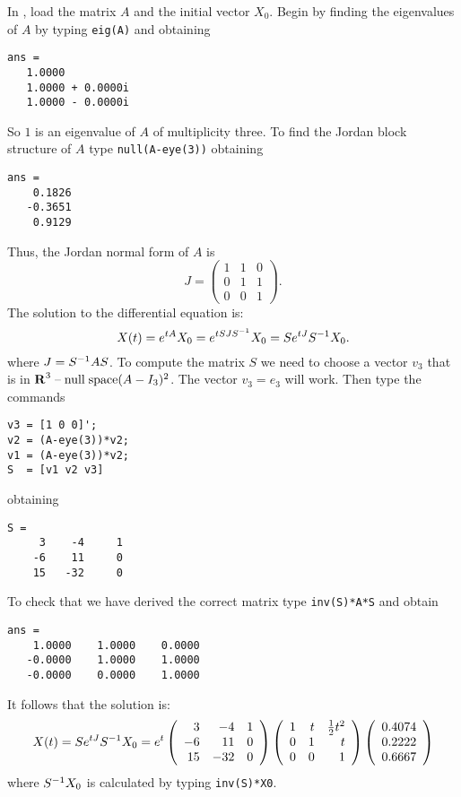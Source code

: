 \soln  In \Matlabp, load the matrix $A$ and the initial vector $X_0$. 
Begin by finding the eigenvalues of $A$ by typing {\tt eig(A)} and
obtaining
\begin{verbatim}
ans =
   1.0000          
   1.0000 + 0.0000i
   1.0000 - 0.0000i
\end{verbatim}
So $1$ is an eigenvalue of $A$ of multiplicity three.  To find the Jordan
block structure of $A$ type {\tt null(A-eye(3))} obtaining
\begin{verbatim}
ans =
    0.1826
   -0.3651
    0.9129
\end{verbatim}
Thus, the Jordan normal form of $A$ is 
\[
J = \left(\begin{array}{rrr} 1 & 1 & 0\\ 0 & 1 & 1\\ 0 & 0 & 1 
\end{array}\right).
\]
The solution to the differential equation is:
\[
X(t) = e^{tA}X_0 = e^{tSJS^{-1}}X_0= Se^{tJ}S^{-1} X_0.
\]
where $J=S^{-1} AS$.  To compute the matrix $S$ we need to choose a vector 
$v_3$ that is in $\mbox{$\bf{R}$}^3\;\mbox{--}\;{\rm null\;space}(A-I_3)^2$.  The vector $v_3=e_3$ will
work. Then type the commands
\begin{verbatim}
v3 = [1 0 0]';
v2 = (A-eye(3))*v2;
v1 = (A-eye(3))*v2;
S  = [v1 v2 v3]
\end{verbatim}
obtaining
\begin{verbatim}
S =
     3    -4     1
    -6    11     0
    15   -32     0
\end{verbatim}
To check that we have derived the correct matrix type {\tt inv(S)*A*S}
and obtain
\begin{verbatim}
ans =
    1.0000    1.0000    0.0000
   -0.0000    1.0000    1.0000
   -0.0000    0.0000    1.0000
\end{verbatim}
It follows that the solution is:
\[
X(t) = Se^{tJ}S^{-1} X_0 = e^t\left(\begin{array}{rrr}
     3  &  -4   &   1\\
    -6   &  11   &   0\\
    15   & -32   &   0 \end{array}\right)
\left(\begin{array}{rrr}
     1  &  t   &   \frac{1}{2}t^2\\
    0   &  1   &   t\\
    0   &  0   &   1 \end{array}\right)
\left(\begin{array}{r} 0.4074\\ 0.2222\\ 0.6667\end{array}\right)
\] 
where $S^{-1} X_0$ is calculated by typing {\tt inv(S)*X0}.

